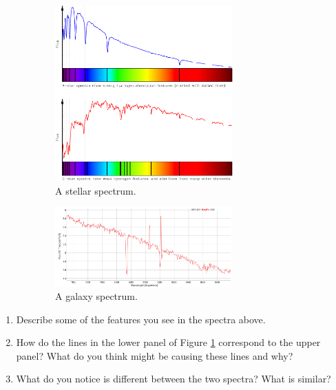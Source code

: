 \documentclass[11pt]{article}
\begin{document}
\bigskip

\begin{figure}[h!]
    \centering
    \begin{subfigure}[b]{0.75\textwidth}
        \centering
        \includegraphics[width=0.75\textwidth,trim={0cm 9.75cm 0cm 0cm},clip]{Images/spectrum.png}
        \caption{A stellar spectrum.}
        \label{fig:stellar_spec}
    \end{subfigure}
    \hfill
    \begin{subfigure}[b]{0.75\textwidth}
        \centering
        \includegraphics[width=0.75\textwidth,trim={0cm 0cm 0cm 1cm},clip]{Images/gal_spec.png}
        \caption{A galaxy spectrum.}
        \label{fig:gal_spec}
    \end{subfigure}
    \caption{}
    \label{fig:spec}
\end{figure}

\medskip
\begin{enumerate}
    \item Describe some of the features you see in the spectra above.
    \item How do the lines in the lower panel of Figure \ref{fig:stellar_spec} correspond to the upper panel? What do you think might be causing these lines and why?
    \item What do you notice is different between the two spectra? What is similar?
\end{enumerate}
\end{document}
